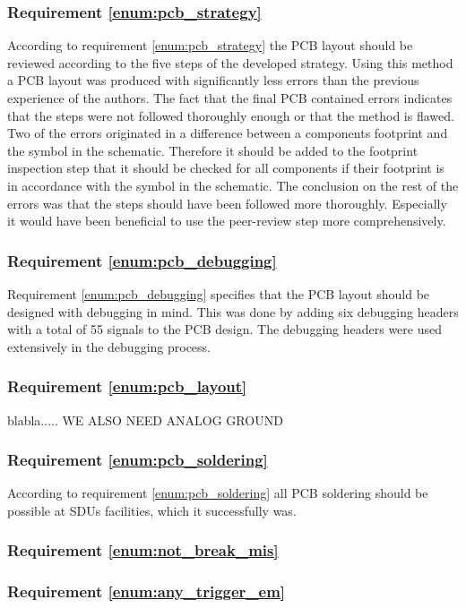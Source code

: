 \subsubsection{Requirement \ref{enum:pcb_strategy}} %
\label{ssub:requirement_enum:pcb_strategy}
According to requirement \ref{enum:pcb_strategy} the PCB layout should be reviewed according to the five steps of the developed strategy.
Using this method a PCB layout was produced with significantly less errors than the previous experience of the authors.
The fact that the final PCB contained errors indicates that the steps were not followed thoroughly enough or that the method is flawed.
Two of the errors originated in a difference between a components footprint and the symbol in the schematic.
Therefore it should be added to the footprint inspection step that it should be checked for all components if their footprint is in accordance with the symbol in the schematic.
The conclusion on the rest of the errors was that the steps should have been followed more thoroughly.
Especially it would have been beneficial to use the peer-review step more comprehensively.

\subsubsection{Requirement \ref{enum:pcb_debugging}} %
\label{ssub:requirement_enum:pcb_debugging}
Requirement \ref{enum:pcb_debugging} specifies that the PCB layout should be designed with debugging in mind.
This was done by adding six debugging headers with a total of 55 signals to the PCB design.
The debugging headers were used extensively in the debugging process.

\subsubsection{Requirement \ref{enum:pcb_layout}} %
\label{ssub:requirement_enum:pcb_layout}
blabla.....
WE ALSO NEED ANALOG GROUND

\subsubsection{Requirement \ref{enum:pcb_soldering}} %
\label{ssub:requirement_enum:pcb_soldering}
According to requirement \ref{enum:pcb_soldering} all PCB soldering should be possible at SDUs facilities, which it successfully was.


\subsubsection{Requirement \ref{enum:not_break_mis}} %
\label{ssub:requirement_enum:not_break_mis}

\subsubsection{Requirement \ref{enum:any_trigger_em}} %
\label{ssub:requirement_enum:any_trigger_em}
